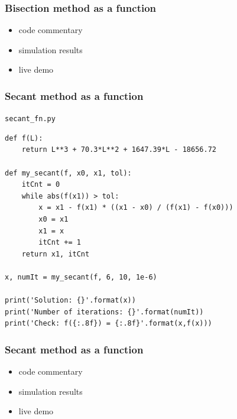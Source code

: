 \documentclass[english,14pt]{beamer}
\begin{document}
\begin{frame}[fragile]

\frametitle{Bisection method as a function}

\begin{itemize}
	\item code commentary
	\item simulation results
	\item live demo
\end{itemize}

\end{frame}


\begin{frame}[fragile]

\frametitle{Secant method as a function}

\texttt{secant\_fn.py}
\begin{lstlisting}[style=CStyle,basicstyle=\scriptsize]
def f(L):
    return L**3 + 70.3*L**2 + 1647.39*L - 18656.72

def my_secant(f, x0, x1, tol):
    itCnt = 0
    while abs(f(x1)) > tol:
        x = x1 - f(x1) * ((x1 - x0) / (f(x1) - f(x0)))
        x0 = x1
        x1 = x
        itCnt += 1
    return x1, itCnt

x, numIt = my_secant(f, 6, 10, 1e-6)

print('Solution: {}'.format(x))
print('Number of iterations: {}'.format(numIt))
print('Check: f({:.8f}) = {:.8f}'.format(x,f(x)))
\end{lstlisting}

\end{frame}


\begin{frame}[fragile]

\frametitle{Secant method as a function}

\begin{itemize}
	\item code commentary
	\item simulation results
	\item live demo
\end{itemize}

\end{frame}

\end{document}
